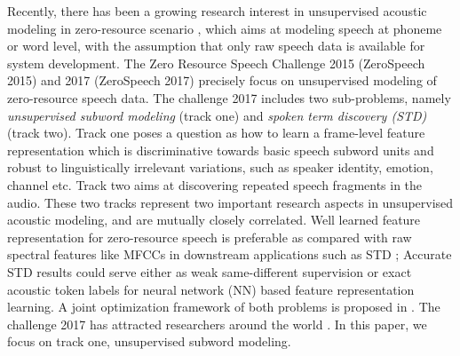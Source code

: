 \documentclass[a4paper]{article}
\begin{document}
Recently, there has been a growing research interest in unsupervised acoustic modeling in zero-resource scenario \cite{glass2012towards,kamper2015fully,thiolliere2015hybrid}, which aims at modeling speech at phoneme or word level, with the assumption that only raw speech data is available for system development.
The Zero Resource Speech Challenge 2015 (ZeroSpeech 2015) \cite{versteegh2015zero} and 2017 (ZeroSpeech 2017) \cite{dunbar2017zero} precisely focus on unsupervised modeling of zero-resource speech data. 
The challenge 2017 includes two sub-problems, namely \textit{unsupervised subword modeling} (track one) and \textit{spoken term discovery (STD)} (track two). Track one poses a question as how to learn a frame-level feature representation which is discriminative towards basic speech subword units and robust to linguistically irrelevant variations, such as speaker identity, emotion, channel etc. Track two aims at discovering repeated speech fragments in the audio. These two tracks represent two important research aspects in unsupervised acoustic modeling, and are mutually closely correlated. Well learned feature representation for zero-resource speech is preferable as compared with raw spectral features like MFCCs in downstream applications such as STD \cite{Chen+2016}; Accurate STD results could  serve either as weak same-different supervision \cite{thiolliere2015hybrid,yuan2017extracting} or exact acoustic token labels \cite{chung2015iterative} for neural network (NN) based feature representation learning. A joint optimization framework of both problems is proposed in \cite{chung2015iterative}.
The challenge 2017 has attracted researchers around the world \cite{shibata2017composite,yuan2017extracting,heck2017feature,ansari2017deep,chen2017multilingual}. 
In this paper, we focus on track one, unsupervised subword modeling. 

\end{document}
